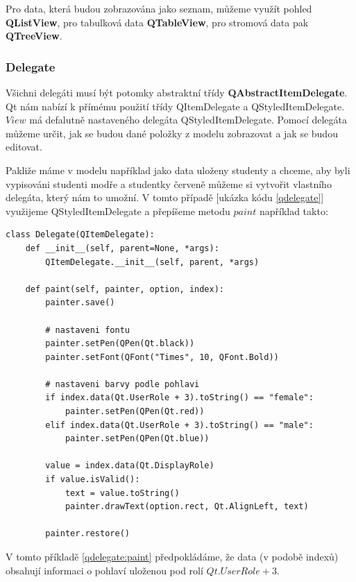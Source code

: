 Pro data, která budou zobrazována jako seznam, můžeme využít pohled \textbf{QListView}, pro tabulková data \textbf{QTableView}, pro stromová data pak \textbf{QTreeView}.

\subsubsection*{Delegate}
Všichni delegáti musí být potomky abstraktní třídy \textbf{QAbstractItemDelegate}. Qt nám nabízí k přímému použití třídy QItemDelegate a QStyledItemDelegate. $View$ má defalutně nastaveného delegáta QStyledItemDelegate. Pomocí delegáta můžeme určit, jak se budou dané položky z modelu zobrazovat a jak se budou editovat. 

Pakliže máme v modelu například jako data uloženy studenty a chceme, aby byli vypisováni studenti modře a studentky červeně můžeme si vytvořit vlastního delegáta, který nám to umožní. V tomto případě [ukázka kódu \ref{qdelegate}] využijeme QStyledItemDelegate a přepíšeme metodu $paint$ například takto: \\

\begin{lstlisting}[label=qdelegate:paint,caption={Delegate - přepsání metody $paint$}, morekeywords={QItemDelegate, Qt, QFont, AlignLeft, DisplayRole, UserRole, QPen}]
class Delegate(QItemDelegate):
    def __init__(self, parent=None, *args):
        QItemDelegate.__init__(self, parent, *args)

    def paint(self, painter, option, index):
        painter.save()       
        
        # nastaveni fontu
        painter.setPen(QPen(Qt.black))
        painter.setFont(QFont("Times", 10, QFont.Bold))
        
		# nastaveni barvy podle pohlavi
        if index.data(Qt.UserRole + 3).toString() == "female":
            painter.setPen(QPen(Qt.red))
        elif index.data(Qt.UserRole + 3).toString() == "male":
            painter.setPen(QPen(Qt.blue))

        value = index.data(Qt.DisplayRole)
        if value.isValid():
            text = value.toString()
            painter.drawText(option.rect, Qt.AlignLeft, text)
            
        painter.restore()
\end{lstlisting}

        
\noindent V tomto příkladě \ref{qdelegate:paint} předpokládáme, že data (v podobě indexů) obsahují informaci o pohlaví uloženou pod rolí $Qt.UserRole + 3$.

